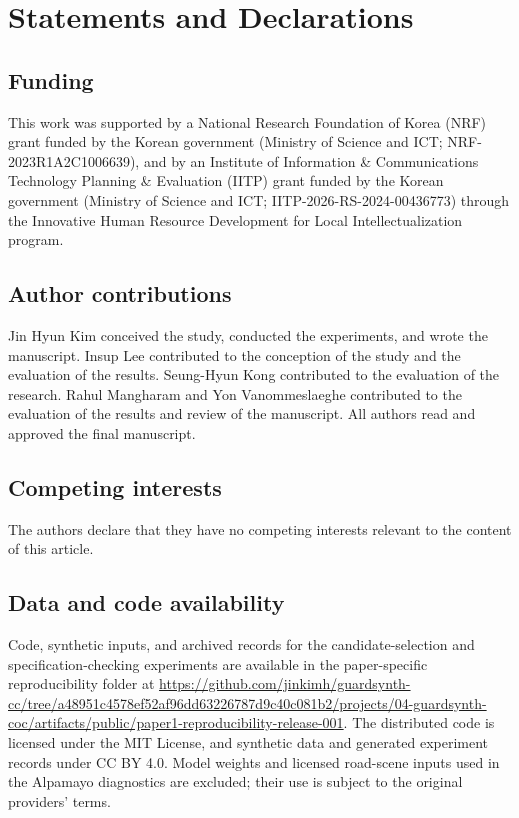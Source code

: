 \section*{Statements and Declarations}
\ifdefined\AnonymousReview
\else
\subsection*{Funding}
This work was supported by a National Research Foundation of Korea (NRF)
grant funded by the Korean government (Ministry of Science and ICT;
NRF-2023R1A2C1006639), and by an Institute of Information \& Communications
Technology Planning \& Evaluation (IITP) grant funded by the Korean government
(Ministry of Science and ICT; IITP-2026-RS-2024-00436773) through the Innovative
Human Resource Development for Local Intellectualization program.

\subsection*{Author contributions}
Jin Hyun Kim conceived the study, conducted the experiments, and wrote the
manuscript. Insup Lee contributed to the conception of the study and the
evaluation of the results. Seung-Hyun Kong contributed to the evaluation of
the research. Rahul Mangharam and Yon Vanommeslaeghe contributed to the
evaluation of the results and review of the manuscript. All authors read and
approved the final manuscript.
\fi

\subsection*{Competing interests}
The authors declare that they have no competing interests relevant to the
content of this article.

\subsection*{Data and code availability}
Code, synthetic inputs, and archived records for the candidate-selection and
specification-checking experiments are available in the paper-specific
reproducibility folder at \url{https://github.com/jinkimh/guardsynth-cc/tree/a48951c4578ef52af96dd63226787d9c40c081b2/projects/04-guardsynth-coc/artifacts/public/paper1-reproducibility-release-001}.
The distributed code is licensed under the MIT License, and synthetic data
and generated experiment records under CC BY 4.0. Model weights and licensed
road-scene inputs used in the Alpamayo diagnostics are excluded; their use
is subject to the original providers' terms.
